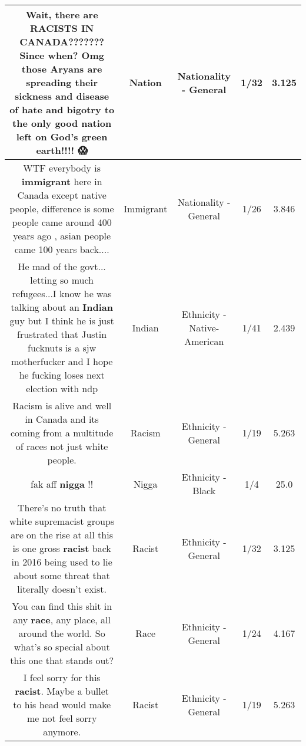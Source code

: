 \documentclass[11pt]{article}
\newlength\mylength
\begin{document}
\begin{center}
\begin{longtable}{|C{.65\mylength}|C{.30\mylength}|C{.12\mylength}|C{.12\mylength}|C{.12\mylength}|}
  \small Wait, there are RACISTS IN CANADA??????? Since when? Omg those Aryans are spreading their sickness and disease  of hate and bigotry to the only good \textbf{nation} left on God's green earth!!!! 😱\normalsize   & Nation & Nationality - General & 1/32 & 3.125 \\  \hline
  \small WTF everybody is \textbf{immigrant} here in Canada except native people, difference is some people came around 400 years ago , asian people came 100 years back....\normalsize   & Immigrant & Nationality - General & 1/26 & 3.846 \\  \hline
  \small He mad of the govt... letting so much refugees...I know he was talking about an \textbf{Indian} guy but I think he is just frustrated that Justin fucknuts is a sjw motherfucker and I hope he fucking loses next election with ndp\normalsize   & Indian & Ethnicity - Native-American & 1/41 & 2.439 \\  \hline
  \small Racism is alive and well in Canada and its coming from a multitude of races not just white people.\normalsize   & Racism & Ethnicity - General & 1/19 & 5.263 \\  \hline
  \small fak aff \textbf{nigga} !!\normalsize   & Nigga & Ethnicity - Black & 1/4 & 25.0 \\  \hline
  \small There's no truth that white supremacist groups are on the rise at all this is one gross \textbf{racist} back in 2016 being used to lie about some threat that literally doesn't exist.\normalsize   & Racist & Ethnicity - General & 1/32 & 3.125 \\  \hline
  \small You can find this shit in any \textbf{race}, any place, all around the world. So what's so special about this one that stands out?\normalsize   & Race & Ethnicity - General & 1/24 & 4.167 \\  \hline
  \small I feel sorry for this \textbf{racist}. Maybe a bullet to his head would make me not feel sorry anymore.\normalsize   & Racist & Ethnicity - General & 1/19 & 5.263 \\  \hline

\end{longtable}
\end{center}
\end{document}
